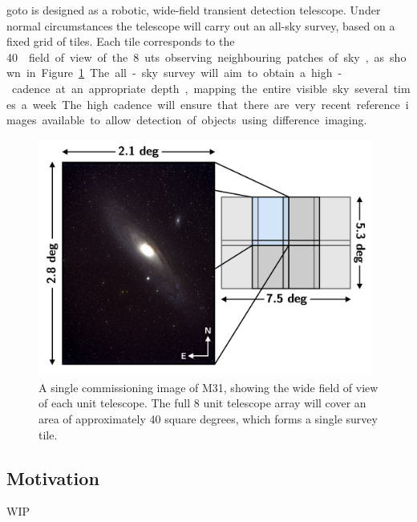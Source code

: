 \begin{colsection}
\begin{colsection}
\gls{goto} is designed as a robotic, wide-field transient detection telescope. Under normal circumstances the telescope will carry out an all-sky survey, based on a fixed grid of tiles. Each tile corresponds to the \SI{40}{\square\deg} field of view of the 8 \glspl{ut} observing neighbouring patches of sky, as shown in Figure~\ref{fig:tiles}. The all-sky survey will aim to obtain a high-cadence at an appropriate depth, mapping the entire visible sky several times a week. The high cadence will ensure that there are very recent reference images available to allow detection of objects using difference imaging.

\begin{figure}[htb]
\begin{center}
\includegraphics[width=11cm]{images/tiles.pdf}
\end{center}
\caption[M31]{A single commissioning image of M31, showing the wide field of view of each unit telescope. The full 8 unit telescope array will cover an area of approximately 40 square degrees, which forms a single survey tile.}
\label{fig:tiles}
\end{figure}

\end{colsection}


\subsection{Motivation}
\label{sec:goto_motivation}
\begin{colsection}

WIP

\end{colsection}



\end{colsection}
